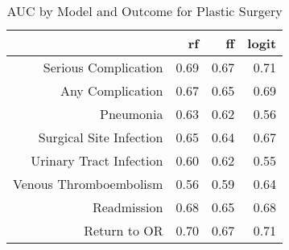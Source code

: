 \begin{table}[ht]
\centering
\begin{tabular}{rrrr}
  \hline
 & rf & ff & logit \\ 
  \hline
Serious Complication & 0.69 & 0.67 & 0.71 \\ 
  Any Complication & 0.67 & 0.65 & 0.69 \\ 
  Pneumonia & 0.63 & 0.62 & 0.56 \\ 
  Surgical Site Infection & 0.65 & 0.64 & 0.67 \\ 
  Urinary Tract Infection & 0.60 & 0.62 & 0.55 \\ 
  Venous Thromboembolism & 0.56 & 0.59 & 0.64 \\ 
  Readmission & 0.68 & 0.65 & 0.68 \\ 
  Return to OR & 0.70 & 0.67 & 0.71 \\ 
   \hline
\end{tabular}
\caption{AUC by Model and Outcome for Plastic Surgery} 
\end{table}
